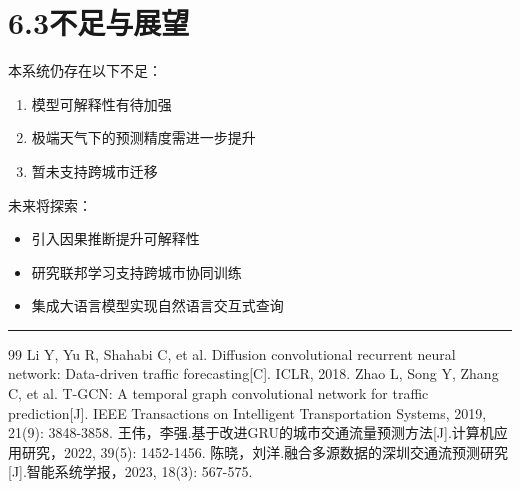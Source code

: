 \documentclass{harryopo-report}
\begin{document}
\section*{6.3不足与展望}

本系统仍存在以下不足：

\begin{enumerate}
  \item 模型可解释性有待加强
  \item 极端天气下的预测精度需进一步提升
  \item 暂未支持跨城市迁移
\end{enumerate}

未来将探索：

\begin{itemize}
  \item 引入因果推断提升可解释性
  \item 研究联邦学习支持跨城市协同训练
  \item 集成大语言模型实现自然语言交互式查询
\end{itemize}

\medskip\hrule\medskip

\begin{thebibliography}{99}
 Li Y, Yu R, Shahabi C, et al. Diffusion convolutional recurrent neural network: Data-driven traffic forecasting[C]. ICLR, 2018.
 Zhao L, Song Y, Zhang C, et al. T-GCN: A temporal graph convolutional network for traffic prediction[J]. IEEE Transactions on Intelligent Transportation Systems, 2019, 21(9): 3848-3858.
 王伟，李强.基于改进GRU的城市交通流量预测方法[J].计算机应用研究，2022, 39(5): 1452-1456.
 陈晓，刘洋.融合多源数据的深圳交通流预测研究[J].智能系统学报，2023, 18(3): 567-575.
\end{thebibliography}
\end{document}
